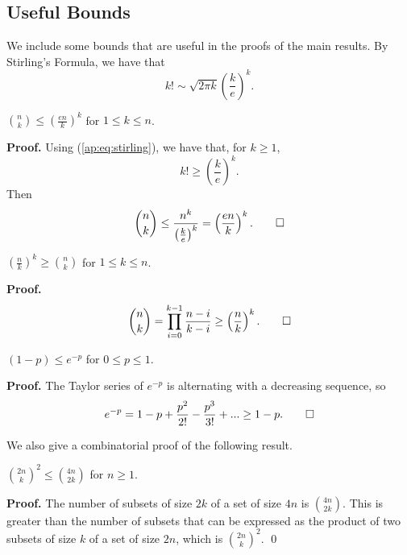 \chapter{}
\section{Useful Bounds}

We include some bounds that are useful in the proofs of the main results. By Stirling's Formula, we have that
\begin{equation}\label{ap:eq:stirling}
    k! \sim \sqrt{2\pi k}\left(\frac{k}{e}\right)^k.
\end{equation}

\begin{proposition}\label{ap:prop:upperbinom}
    $\binom{n}{k} \leq \left(\frac{en}{k}\right)^k$ for $1 \leq k \leq n$. 
\end{proposition}

\textbf{Proof. } Using (\ref{ap:eq:stirling}), we have that, for $k \geq 1$, 
\[k! \geq \left(\frac{k}{e}\right)^k.\]
Then
\[\binom{n}{k} \leq \frac{n^k}{\left(\frac{k}{e}\right)^k} = \left(\frac{en}{k}\right)^k. \qed\]

\begin{proposition}\label{ap:prop:lowebinom}
    $\left(\frac{n}{k}\right)^k \geq \binom{n}{k}$ for $1 \leq k \leq n$.
\end{proposition}

\textbf{Proof. }
\[\binom{n}{k} = \prod_{i = 0}^{k - 1} \frac{n - i}{k - i} \geq \left(\frac{n}{k}\right)^k. \qed\]

\begin{proposition}\label{ap:prop:exp}
    $(1 - p) \leq e^{-p}$ for $0 \leq p \leq 1$.
\end{proposition}

\textbf{Proof. } The Taylor series of $e^{-p}$ is alternating with a decreasing sequence, so
\[e^{-p} = 1 - p + \frac{p^2}{2!} - \frac{p^3}{3!} + ... \geq 1 - p. \qed\]

We also give a combinatorial proof of the following result.

\begin{proposition}\label{ap:prop:binom}
    $\binom{2n}{k}^2 \leq \binom{4n}{2k}$ for $n \geq 1$. 
\end{proposition}

\textbf{Proof. } The number of subsets of size $2k$ of a set of size $4n$ is $\binom{4n}{2k}$. This is greater than the number of subsets that can be expressed as the product of two subsets of size $k$ of a set of size $2n$, which is $\binom{2n}{k}^2$. \qed

